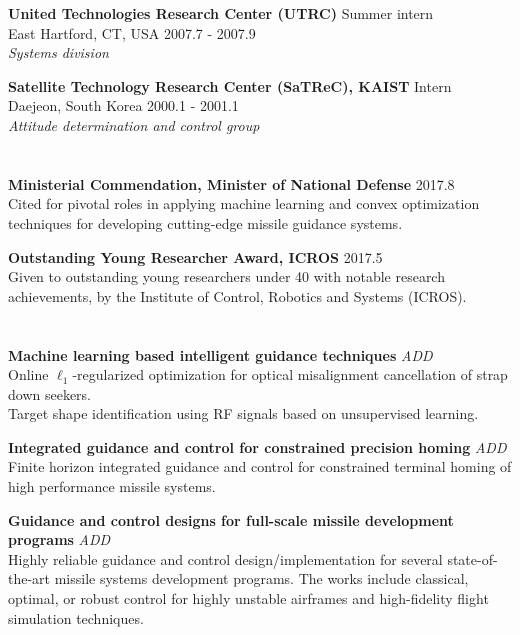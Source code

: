 \documentclass[margin,line]{res}
\begin{document}
\begin{resume}
\textbf{United Technologies Research Center (UTRC)} \hfill {Summer intern} \\
East Hartford, CT, USA \hfill {2007.7 - 2007.9} \\
\emph{Systems division}

\textbf{Satellite Technology Research Center (SaTReC), KAIST} \hfill {Intern}
\\ 
Daejeon, South Korea \hfill {2000.1 - 2001.1} \\
\emph{Attitude determination and control group}

\section{}

\textbf{Ministerial Commendation, Minister of National Defense} \hfill{2017.8} \\
Cited for pivotal roles in applying machine learning and convex optimization techniques for developing cutting-edge missile guidance systems. 

\textbf{Outstanding Young Researcher Award, ICROS} \hfill {2017.5} \\
Given to outstanding young researchers under 40 with notable research achievements, by the Institute of Control, Robotics and Systems (ICROS).

\section{}

\textbf{Machine learning based intelligent guidance techniques}
\hfill \emph{ADD}\\%
Online $\ell_1$-regularized optimization for optical misalignment cancellation of strap down seekers. \\ 
Target shape identification using RF signals based on unsupervised learning.

\textbf{Integrated guidance and control for constrained precision homing}
\hfill \emph{ADD} \\
Finite horizon integrated guidance and control for constrained terminal homing of high performance missile systems.

\textbf{Guidance and control designs for full-scale missile development programs}
\hfill \emph{ADD} \\
Highly reliable guidance and control design/implementation for several state-of-the-art missile systems development programs. The works include classical, optimal, or robust control for highly unstable airframes and high-fidelity flight simulation techniques.


\end{resume}
\end{document}
